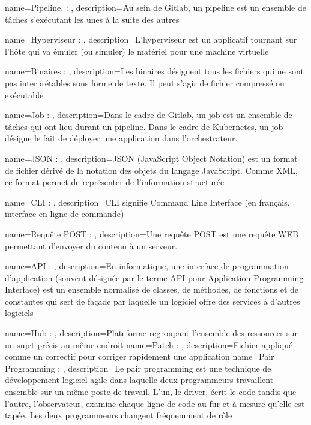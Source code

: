 {
    name=Pipeline. : ,
    description={Au sein de Gitlab, un pipeline est un ensemble de tâches s'exécutant les unes à la suite des autres}
}


{
    name=Hyperviseur : ,
    description={L’hyperviseur est un applicatif tournant sur l’hôte qui va émuler (ou simuler) le matériel pour une machine virtuelle}
}

{
    name=Binaires : ,
    description={Les binaires désignent tous les fichiers qui ne sont pas interprétables sous forme de texte. Il peut s'agir de fichier compressé ou exécutable}
}

{
    name=Job : ,
    description={Dans le cadre de Gitlab, un job est un ensemble de tâches qui ont lieu durant un pipeline. Dans le cadre de Kubernetes, un job désigne le fait de déployer une application dans l'orchestrateur.}
}

{
    name=JSON : ,
    description={JSON (JavaScript Object Notation) est un format de fichier dérivé de la notation des objets du langage JavaScript. Comme XML, ce format permet de représenter de l’information structurée}
}

{
    name=CLI : ,
    description={CLI signifie Command Line Interface (en français, interface en ligne de commande)}
}

{
    name=Requête POST : ,
    description={Une requête POST est une requête WEB permettant d'envoyer du contenu à un serveur.}
}

{
    name=API : ,
    description={En informatique, une interface de programmation d’application (souvent désignée par le terme API pour Application Programming Interface) est un ensemble normalisé de classes, de méthodes, de fonctions et de constantes qui sert de façade par laquelle un logiciel offre des services à d'autres logiciels}
}

{
    name=Hub : ,
    description={Plateforme regroupant l’ensemble des ressources sur un sujet précis au même endroit}
}
{
    name=Patch : ,
    description={Fichier appliqué comme un correctif pour corriger rapidement une application}
}
{
    name=Pair Programming : ,
    description={Le pair programming est une technique de développement logiciel agile dans laquelle deux programmeurs travaillent ensemble sur un même poste de travail. L’un, le driver, écrit le code tandis que l’autre, l’observateur, examine chaque ligne de code au fur et à mesure qu’elle est tapée. Les deux programmeurs changent fréquemment de rôle}
}

